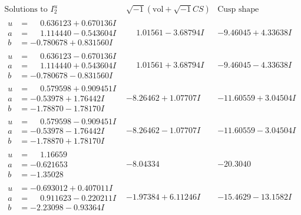 \documentclass[1p]{elsarticle_modified}
\theoremstyle{definition}
\newcommand{\I}{\sqrt{-1}}
\begin{document}
$$\begin{array}{c|c|c}  
\text{Solutions to }I^u_{2}& \I (\text{vol} + \sqrt{-1}CS) & \text{Cusp shape}\\
 \hline 
\begin{aligned}
u &= \phantom{-}0.636123 + 0.670136 I \\
a &= \phantom{-}1.114440 - 0.543604 I \\
b &= -0.780678 + 0.831560 I\end{aligned}
 & \phantom{-}1.01561 - 3.68794 I & -9.46045 + 4.33638 I \\ \hline\begin{aligned}
u &= \phantom{-}0.636123 - 0.670136 I \\
a &= \phantom{-}1.114440 + 0.543604 I \\
b &= -0.780678 - 0.831560 I\end{aligned}
 & \phantom{-}1.01561 + 3.68794 I & -9.46045 - 4.33638 I \\ \hline\begin{aligned}
u &= \phantom{-}0.579598 + 0.909451 I \\
a &= -0.53978 + 1.76442 I \\
b &= -1.78870 - 1.78170 I\end{aligned}
 & -8.26462 + 1.07707 I & -11.60559 + 3.04504 I \\ \hline\begin{aligned}
u &= \phantom{-}0.579598 - 0.909451 I \\
a &= -0.53978 - 1.76442 I \\
b &= -1.78870 + 1.78170 I\end{aligned}
 & -8.26462 - 1.07707 I & -11.60559 - 3.04504 I \\ \hline\begin{aligned}
u &= \phantom{-}1.16659\phantom{ +0.000000I} \\
a &= -0.621653\phantom{ +0.000000I} \\
b &= -1.35028\phantom{ +0.000000I}\end{aligned}
 & -8.04334\phantom{ +0.000000I} & -20.3040\phantom{ +0.000000I} \\ \hline\begin{aligned}
u &= -0.693012 + 0.407011 I \\
a &= \phantom{-}0.911623 - 0.220211 I \\
b &= -2.23098 - 0.93364 I\end{aligned}
 & -1.97384 + 6.11246 I & -15.4629 - 13.1582 I \\ \hline\begin{aligned}

\end{aligned}
\end{array}$$
\end{document}
